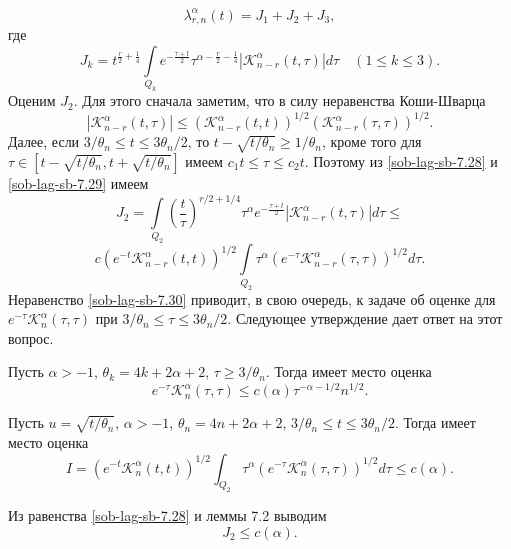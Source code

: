 \begin{equation}\label{sob-lag-sb-7.27}
\lambda_{r,n}^\alpha(t)=J_1+J_2+J_3,
\end{equation}
где
\begin{equation}\label{sob-lag-sb-7.28}
  J_k=t^{\frac r2+\frac14}\int\limits_{Q_k} e^{-\frac{\tau+t}2}\tau^{\alpha-\frac r2-\frac14}|\mathcal{K}_{n-r}^\alpha(t,\tau)|d\tau\quad(1\le k\le 3).
\end{equation}
Оценим $J_2$. Для этого сначала заметим, что в силу неравенства Коши-Шварца
\begin{equation}\label {7.29}
|\mathcal{K}_{n-r}^\alpha(t,\tau)|\le (\mathcal{K}_{n-r}^\alpha(t,t))^{1/2}(\mathcal{K}_{n-r}^\alpha(\tau,\tau))^{1/2}.
\end{equation}
Далее, если $3/\theta_n\le t\le 3\theta_n/2$, то $t-\sqrt{t/\theta_n}\ge1/\theta_n$, кроме того для $\tau\in[t-\sqrt{t/\theta_n},t+\sqrt{t/\theta_n}]$ имеем $c_1t\le \tau\le c_2t$. Поэтому из \eqref{sob-lag-sb-7.28} и \eqref{sob-lag-sb-7.29} имеем
$$
J_2=\int\limits_{Q_2}\left(\frac{t}{\tau}\right)^{r/2+1/4}\tau^\alpha e^{-\frac{\tau+t}2}|\mathcal{K}_{n-r}^\alpha(t,\tau)|d\tau\le
$$
\begin{equation}\label{sob-lag-sb-7.30}
c(e^{-t}\mathcal{K}_{n-r}^\alpha(t,t))^{1/2} \int\limits_{Q_2}\tau^\alpha  (e^{-\tau}\mathcal{K}_{n-r}^\alpha(\tau,\tau))^{1/2}d\tau.
\end{equation}
Неравенство \eqref{sob-lag-sb-7.30} приводит, в свою очередь, к задаче об оценке для $e^{-\tau}\mathcal{K}_{n}^\alpha(\tau,\tau)$ при
$3/\theta_n\le \tau\le 3\theta_n/2$. Следующее утверждение дает ответ на этот вопрос.

\begin{lemma}\label{sob-lag-sb-7.1}
Пусть $\alpha>-1$, $\theta_k=4k+2\alpha+2$, $\tau\ge3/\theta_n$. Тогда имеет место оценка
\begin{equation}\label{sob-lag-sb-7.31}
e^{-\tau}\mathcal{K}_{n}^\alpha(\tau,\tau)\le c(\alpha)\tau^{-\alpha-1/2}n^{1/2}.
\end{equation}
\end{lemma}
\begin{lemma}\label{sob-lag-sb-7.2}
Пусть $u=\sqrt{t/\theta_n}$, $\alpha>-1$, $\theta_n=4n+2\alpha+2$, $3/\theta_n\le t \le 3\theta_n/2$. Тогда имеет место оценка
\begin{equation}\label{sob-lag-sb-7.41}
I=(e^{-t}\mathcal{K}_{n}^\alpha(t,t))^{1/2}\int_{Q_2} \tau^{\alpha}(e^{-\tau}\mathcal{K}_{n}^\alpha(\tau,\tau))^{1/2}d\tau\le c(\alpha).
\end{equation}
\end{lemma}
 Из равенства \eqref{sob-lag-sb-7.28} и леммы 7.2 выводим
\begin{equation}\label{sob-lag-sb-7.42}
J_2\le c(\alpha).
\end{equation}

